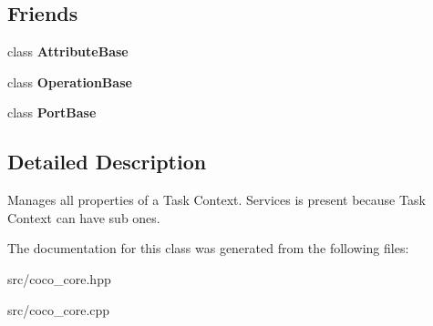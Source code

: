\subsection*{Friends}
\begin{DoxyCompactItemize}
\item 
\hypertarget{classcoco_1_1_service_a9a2db6fab4360da4f4662d33fab5c5f0}{}class {\bfseries Attribute\+Base}\label{classcoco_1_1_service_a9a2db6fab4360da4f4662d33fab5c5f0}

\item 
\hypertarget{classcoco_1_1_service_a0fd190fbc59c52d7087458074a7fc191}{}class {\bfseries Operation\+Base}\label{classcoco_1_1_service_a0fd190fbc59c52d7087458074a7fc191}

\item 
\hypertarget{classcoco_1_1_service_ad41531ff250556a868c747823db25142}{}class {\bfseries Port\+Base}\label{classcoco_1_1_service_ad41531ff250556a868c747823db25142}

\end{DoxyCompactItemize}


\subsection{Detailed Description}
Manages all properties of a Task Context. Services is present because Task Context can have sub ones. 

The documentation for this class was generated from the following files\+:\begin{DoxyCompactItemize}
\item 
src/coco\+\_\+core.\+hpp\item 
src/coco\+\_\+core.\+cpp\end{DoxyCompactItemize}
